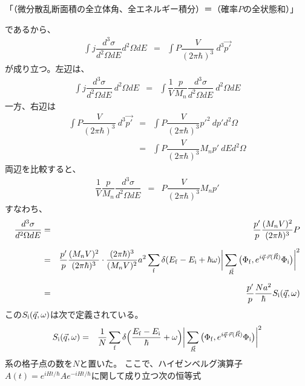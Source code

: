 \documentclass[a4j]{jsarticle}
\begin{document}
「（微分散乱断面積の全立体角、全エネルギー積分）＝（確率$P$の全状態和）」

であるから、
\begin{eqnarray}
	\int
	j
	\dfrac{ d^{3} \sigma }{ d^{2} \Omega d E }
	d^{2} \Omega d E
	&=&
	\int P \dfrac{V}{ ( 2 \pi \hbar)^{3} }
	\ d^{3} \vec{p'}
\end{eqnarray}
が成り立つ。左辺は、
\begin{eqnarray}
	\int
	j
	\dfrac{ d^{3} \sigma }{ d^{2} \Omega d E }
	\ d^{2} \Omega d E
	&=&
	\int
	\dfrac{1}{V}
	\dfrac{p}{M_{n}}
	\dfrac{ d^{3} \sigma }{ d^{2} \Omega d E }
	\ d^{2} \Omega d E
\end{eqnarray}
一方、右辺は
\begin{eqnarray}
	\int P \dfrac{V}{ ( 2 \pi \hbar)^{3} }
	\ d^{3} \vec{p'}
	&=&
	\int P \dfrac{V}{ ( 2 \pi \hbar)^{3} }
	p'^{2}
	\ d p' d^{2} \Omega
	\nonumber \\[3mm]　&=&
	\int P \dfrac{V}{ ( 2 \pi \hbar)^{3} }
	M_{n} p'
	\ d E d^{2} \Omega
\end{eqnarray}
両辺を比較すると、
\begin{eqnarray}
	\dfrac{1}{V}
	\dfrac{p}{M_{n}}
	\dfrac{ d^{3} \sigma }{ d^{2} \Omega d E }
	&=&
	P \dfrac{V}{ ( 2 \pi \hbar)^{3} }
	M_{n} p'
\end{eqnarray}
すなわち、
\begin{eqnarray}
	\dfrac{ d^{3} \sigma }{ d^{2} \Omega d E }
	&=&
	\dfrac{p'}{p}
	\dfrac{(M_{n} V)^{2}}{ ( 2 \pi \hbar)^{3} }
	P
	\nonumber \\[2mm] &=&
	\dfrac{p'}{p}
	\dfrac{(M_{n} V)^{2}}{ ( 2 \pi \hbar)^{3} }
	\cdot
	\dfrac{ ( 2 \pi \hbar )^{3} }{ ( M_{n} V )^{2} }
	a^{2}
	\sum_{\rm f}
	\delta( E_{\rm f} - E_{\rm i} + \hbar \omega )
	\bigg|
	\sum_{\vec{R}}
	\big( \Phi_{\rm f} , e^{i \vec{q} \cdot \vec{r}(\vec{R})} \Phi_{\rm i} \big)
	\bigg|^{2}
	\nonumber \\[2mm] &=&
	\dfrac{p'}{p}
	\dfrac{ N a^{2} }{ \hbar }
	S_{\rm i}(\vec{q},\omega)
\end{eqnarray}
この$S_{\rm i}(\vec{q},\omega)$は次で定義されている。
\begin{eqnarray}
	S_{\rm i}(\vec{q},\omega)
	&=&
	\dfrac{1}{N}
	\sum_{\rm f}
	\delta \Big( \dfrac{E_{\rm f} - E_{\rm i}}{\hbar} + \omega \Big)
	\bigg|
	\sum_{\vec{R}}
	\big( \Phi_{\rm f} , e^{i \vec{q} \cdot \vec{r}(\vec{R})} \Phi_{\rm i} \big)
	\bigg|^{2}
\end{eqnarray}
系の格子点の数を$N$と置いた。
ここで、ハイゼンベルグ演算子$A(t)=e^{i H t/ \hbar} A e^{-i H t/ \hbar}$に関して成り立つ次の恒等式
\end{document}

